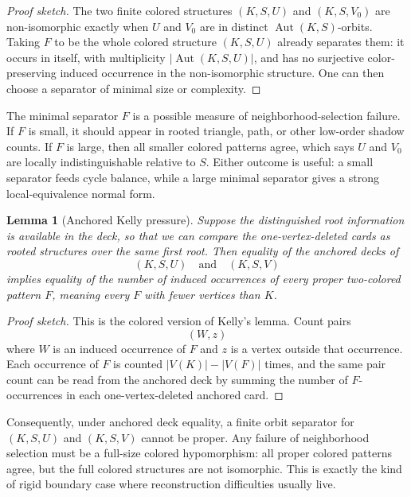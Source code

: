 \documentclass[11pt]{article}
\newtheorem{lemma}{Lemma}
\newcommand{\Aut}{\operatorname{Aut}}
\begin{document}
\begin{proof}[Proof sketch]
The two finite colored structures \((K,S,U)\) and \((K,S,V_0)\) are
non-isomorphic exactly when \(U\) and \(V_0\) are in distinct
\(\Aut(K,S)\)-orbits.  Taking \(F\) to be the whole colored structure
\((K,S,U)\) already separates them: it occurs in itself, with multiplicity
\(|\Aut(K,S,U)|\), and has no surjective color-preserving induced occurrence
in the non-isomorphic structure.  One can then choose a separator of minimal
size or complexity.
\end{proof}

The minimal separator \(F\) is a possible measure of neighborhood-selection
failure.  If \(F\) is small, it should appear in rooted triangle, path, or
other low-order shadow counts.  If \(F\) is large, then all smaller colored
patterns agree, which says \(U\) and \(V_0\) are locally indistinguishable
relative to \(S\).  Either outcome is useful: a small separator feeds cycle
balance, while a large minimal separator gives a strong local-equivalence
normal form.

\begin{lemma}[Anchored Kelly pressure]
Suppose the distinguished root information is available in the deck, so that
we can compare the one-vertex-deleted cards as rooted structures over the
same first root.  Then equality of the anchored decks of
\[
  (K,S,U)
  \quad\text{and}\quad
  (K,S,V)
\]
implies equality of the number of induced occurrences of every proper
two-colored pattern \(F\), meaning every \(F\) with fewer vertices than \(K\).
\end{lemma}

\begin{proof}[Proof sketch]
This is the colored version of Kelly's lemma.  Count pairs
\[
  (W,z)
\]
where \(W\) is an induced occurrence of \(F\) and \(z\) is a vertex outside
that occurrence.  Each occurrence of \(F\) is counted \(|V(K)|-|V(F)|\) times,
and the same pair count can be read from the anchored deck by summing the
number of \(F\)-occurrences in each one-vertex-deleted anchored card.
\end{proof}

Consequently, under anchored deck equality, a finite orbit separator for
\((K,S,U)\) and \((K,S,V)\) cannot be proper.  Any failure of neighborhood
selection must be a full-size colored hypomorphism: all proper colored
patterns agree, but the full colored structures are not isomorphic.  This is
exactly the kind of rigid boundary case where reconstruction difficulties
usually live.
\end{document}
